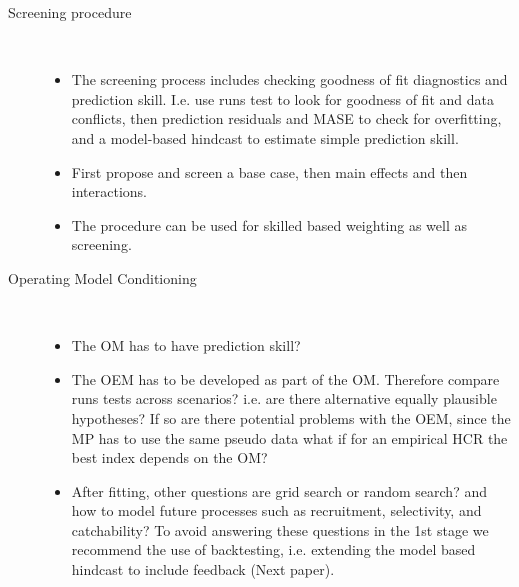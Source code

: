 \begin{description}
    \item[Screening procedure]~
    \begin{itemize}
        \item The screening process includes checking goodness of fit diagnostics and prediction skill. I.e. use runs test to look for goodness of fit and data conflicts, then prediction residuals and MASE to check for overfitting, and a model-based hindcast to estimate simple prediction skill.
        \item First propose and screen a base case, then main effects and then interactions. 
       \item The procedure can be used for skilled based weighting as well as screening.
    \end{itemize}
  \item[Operating Model Conditioning]~
    \begin{itemize}   
        \item The OM has to have prediction skill? 
        \item The OEM has to be developed as part of the OM. Therefore compare runs tests across scenarios? i.e. are there alternative equally plausible hypotheses? If so are there potential problems with the OEM, since the MP has to use the same pseudo data what if for an empirical HCR the best index depends on the OM?
    \item After fitting, other questions are grid search or random search? and how to model future processes such as recruitment, selectivity, and catchability? To avoid answering these questions in the 1st stage we recommend the use of backtesting, i.e. extending the model based hindcast to include feedback (Next paper).
  \end{itemize}


\end{description}

